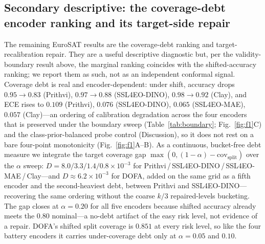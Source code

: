 \documentclass[journal]{IEEEtran}
\renewcommand{\_}{\textunderscore\allowbreak}
\begin{document}
\subsection{Secondary descriptive: the coverage-debt encoder ranking and its target-side repair}
The remaining EuroSAT results are the coverage-debt ranking and target-recalibration repair. They are a
useful descriptive diagnostic but, per the validity-boundary result above, the marginal ranking coincides
with the shifted-accuracy ranking; we report them as such, not as an independent conformal signal.
Coverage debt is real and encoder-dependent: under shift, accuracy drops $0.95\to0.83$ (Prithvi),
$0.97\to0.88$ (SSL4EO-DINO), $0.98\to0.92$ (Clay), and ECE rises to $0.109$ (Prithvi),
$0.076$ (SSL4EO-DINO), $0.065$ (SSL4EO-MAE), $0.057$ (Clay)---an ordering of calibration degradation across
the four encoders that is preserved under the boundary sweep (Table~\ref{tab:boundary};
Fig.~\ref{fig:f1}C) and the
class-prior-balanced probe control (Discussion), so it does not rest on a bare four-point monotonicity
(Fig.~\ref{fig:f1}A--B). As a continuous, bucket-free debt measure we integrate the target coverage gap
$\max(0,(1-\alpha)-\mathrm{cov}_{\mathrm{split}})$ over the $\alpha$ sweep:
$D = 8.0 / 3.3 / 1.4 / 0.8 \times 10^{-3}$ for Prithvi\,/\,SSL4EO-DINO\,/\,SSL4EO-MAE\,/\,Clay---and $D\approx6.2\times10^{-3}$ for DOFA, added on the same grid as a fifth encoder and the second-heaviest debt, between Prithvi and SSL4EO-DINO---recovering the
same ordering without the coarse $k/3$ repaired-levels bucketing. The gap closes at $\alpha=0.20$ for all
five encoders because shifted accuracy already meets the $0.80$ nominal---a no-debt artifact of the
easy risk level, not evidence of a repair. DOFA's shifted split coverage is $0.851$ at every risk level, so
like the four battery encoders it carries under-coverage debt only at $\alpha=0.05$ and $0.10$.
\end{document}
